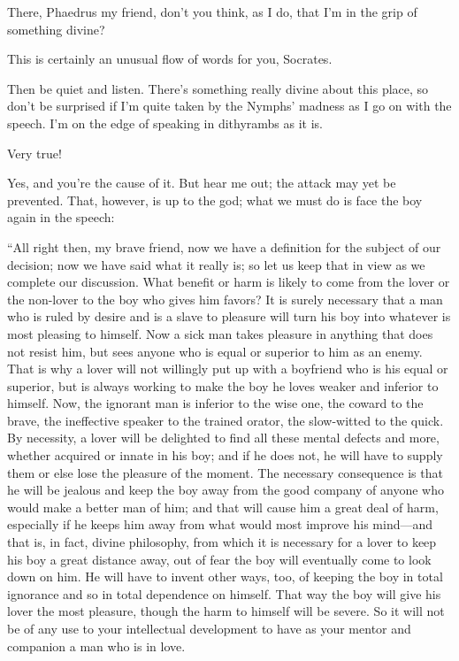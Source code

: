 There, Phaedrus my friend, don't you think, as I do, that I'm in the
grip of something divine?

\sayphaedrus This is certainly an unusual flow of words for you, Socrates.

\saysocrates Then be quiet and listen. There's something really divine
about this place, so don't be surprised if I'm quite taken by the
Nymphs' madness as I go on with the speech. I'm on the edge of
speaking in dithyrambs
as it is.

\sayphaedrus Very true!

\saysocrates Yes, and you're the cause of it. But hear me out; the attack
may yet be prevented. That, however, is up to the god; what we must do
is face the boy again in the speech:

“All right then, my brave friend, now we have a definition for the
subject of our decision; now we have said what it really is; so let us
keep that in view as we complete our discussion. What benefit or
harm is likely to come from the lover or the non-lover to the boy who
gives him favors? It is surely necessary that a man who is ruled by
desire and is a slave to pleasure will turn his boy into whatever is
most pleasing to himself. Now a sick man takes pleasure in anything that
does not resist him, but sees anyone who is equal or
superior to him as an enemy. That is why a lover will not willingly put
up with a boyfriend who is his equal or superior, but is always working
to make the boy he loves weaker and inferior to himself. Now, the
ignorant man is inferior to the wise one, the coward to the brave, the
ineffective speaker to the trained orator, the slow-witted to the quick.
By necessity, a lover will be delighted to find all these mental defects
and more, whether acquired or innate in his boy; and if he does not, he
will have to supply them or else lose the pleasure of the moment. 
The necessary consequence is that he will be jealous and keep
the boy away from the good company of anyone who would make a better man
of him; and that will cause him a great deal of harm, especially if he
keeps him away from what would most improve his mind---and that is, in
fact, divine philosophy, from which it is necessary for a lover to keep
his boy a great distance away, out of fear the boy will eventually come
to look down on him. He will have to invent other ways, too, of keeping
the boy in total ignorance and so in total dependence on himself. That
way the boy will give his lover the most pleasure, though the
harm to himself will be severe. So it will not be of any use to your
intellectual development to have as your mentor and companion a man who
is in love.

